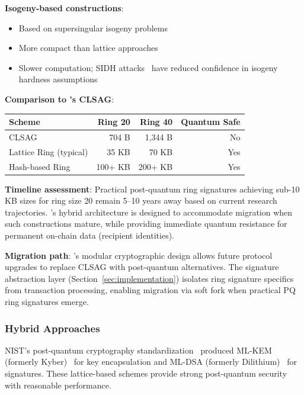 \textbf{Isogeny-based constructions}:
\begin{itemize}
  \item Based on supersingular isogeny problems
  \item More compact than lattice approaches
  \item Slower computation; SIDH attacks~\cite{sidh-attack} have reduced
    confidence in isogeny hardness assumptions
\end{itemize}

\textbf{Comparison to \Botho's CLSAG}:
\begin{center}
\begin{tabular}{@{}lrrr@{}}
\toprule
\textbf{Scheme} & \textbf{Ring 20} & \textbf{Ring 40} & \textbf{Quantum Safe} \\
\midrule
CLSAG & 704 B & 1,344 B & No \\
Lattice Ring (typical) & 35 KB & 70 KB & Yes \\
Hash-based Ring & 100+ KB & 200+ KB & Yes \\
\bottomrule
\end{tabular}
\end{center}

\textbf{Timeline assessment}: Practical post-quantum ring signatures achieving
sub-10 KB sizes for ring size 20 remain 5--10 years away based on current
research trajectories. \Botho's hybrid architecture is designed to accommodate
migration when such constructions mature, while providing immediate quantum
resistance for permanent on-chain data (recipient identities).

\textbf{Migration path}: \Botho's modular cryptographic design allows future
protocol upgrades to replace CLSAG with post-quantum alternatives. The
signature abstraction layer (Section~\ref{sec:implementation}) isolates ring
signature specifics from transaction processing, enabling migration via soft
fork when practical PQ ring signatures emerge.

\subsubsection{Hybrid Approaches}

NIST's post-quantum cryptography standardization~\cite{nist-pqc} produced
ML-KEM (formerly Kyber)~\cite{fips203,kyber} for key encapsulation and ML-DSA (formerly
Dilithium)~\cite{fips204,dilithium} for signatures. These lattice-based schemes provide strong
post-quantum security with reasonable performance.

